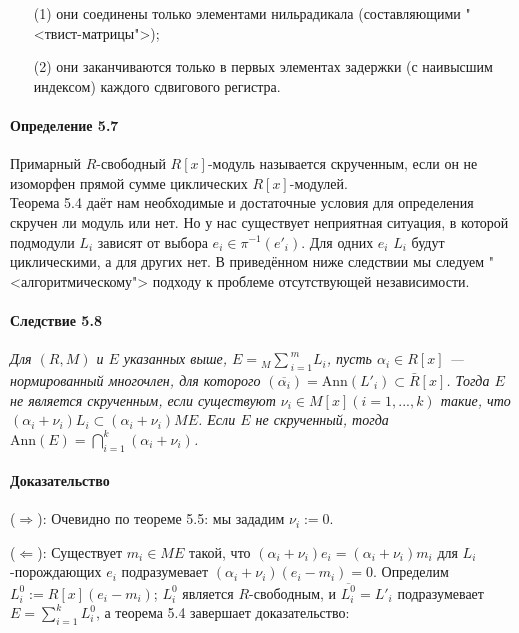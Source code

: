 \documentclass[a4paper,12pt]{article}
\newcommand{\dirsummod}[1]{{_{{#1}}\!\!\sum}}
\newcommand{\Ann}{\text{Ann}}
\begin{document}
\begin{enumerate}
	\item[(1)] они соединены только элементами нильрадикала (составляющими "<твист-матрицы">);
	\item[(2)] они заканчиваются только в первых элементах задержки (с наивысшим индексом) каждого сдвигового регистра.
\end{enumerate}

\paragraph{Определение 5.7}
Примарный $R$-свободный $R[x]$-модуль называется скрученным, если он не изоморфен прямой сумме циклических $R[x]$-модулей. \\

Теорема 5.4 даёт нам необходимые и достаточные условия для определения скручен ли модуль или нет. Но у нас существует неприятная ситуация, в которой подмодули $L_i$ зависят от выбора $e_i \in \pi^{-1}(e'_i)$. Для одних $e_i$ $L_i$ будут циклическими, а для других нет. В приведённом ниже следствии мы следуем "<алгоритмическому"> подходу к проблеме отсутствующей независимости.


\paragraph{Следствие 5.8}
{\itshape
	Для $(R, M)$ и $E$ указанных выше, $E = \dirsummod{M}_{i=1}^m L_i$, пусть $\alpha_i \in R[x]$ --- нормированный многочлен, для которого $(\overline{\alpha_i}) = \Ann(L'_i) \subset \bar{R}[x]$. Тогда $E$ не является скрученным, если существуют $\nu_i \in M[x] (i = 1, ..., k)$ такие, что $(\alpha_i + \nu_i)L_i \subset (\alpha_i + \nu_i) M E$. Если $E$ не скрученный, тогда $\Ann(E) = \bigcap_{i=1}^k (\alpha_i + \nu_i)$. 
}

\paragraph{Доказательство}
($\Rightarrow$): Очевидно по теореме 5.5: мы зададим $\nu_i := 0$.

($\Leftarrow$): Существует $m_i \in M E$ такой, что $(\alpha_i + \nu_i)e_i = (\alpha_i + \nu_i) m_i$ для $L_i$-порождающих $e_i$ подразумевает $(\alpha_i + \nu_i)(e_i - m_i) = 0$. Определим $L_i^0 := R[x](e_i - m_i)$; $L_i^0$ является $R$-свободным, и $\overline{L_i^0} = L'_i$ подразумевает $E = \sum_{i = 1}^{k} L_i^0$, а теорема 5.4 завершает доказательство:
\end{document}
